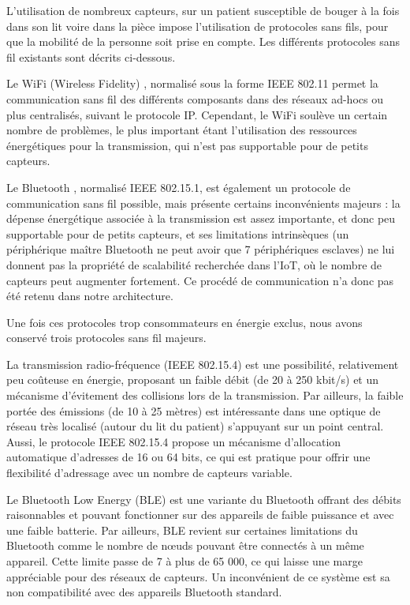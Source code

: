 \documentclass{article}
\begin{document}
L’utilisation de nombreux capteurs, sur un patient susceptible de bouger à la fois dans son lit voire dans la pièce impose l’utilisation de protocoles sans fils, pour que la mobilité de la personne soit prise en compte. Les différents protocoles sans fil existants sont décrits ci-dessous.

Le WiFi (Wireless Fidelity) \cite{Wifi}, normalisé sous la forme IEEE 802.11 permet la communication sans fil des différents composants dans des réseaux ad-hocs ou plus centralisés, suivant le protocole IP. Cependant, le WiFi soulève un certain nombre de problèmes, le plus important étant l'utilisation des ressources énergétiques pour la transmission, qui n’est pas supportable pour de petits capteurs.

Le Bluetooth \cite{Bluetooth}, normalisé IEEE 802.15.1, est également un protocole de communication sans fil possible, mais présente certains inconvénients majeurs : la dépense énergétique associée à la transmission est assez importante, et donc peu supportable pour de petits capteurs, et ses limitations intrinsèques (un périphérique maître Bluetooth ne peut avoir que 7 périphériques esclaves) ne lui donnent pas la propriété de scalabilité recherchée dans l'IoT, où le nombre de capteurs peut augmenter fortement. Ce procédé de communication n'a donc pas été retenu dans notre architecture.

Une fois ces protocoles trop consommateurs en énergie exclus, nous avons conservé trois protocoles sans fil majeurs.

La transmission radio-fréquence (IEEE 802.15.4) \cite{1IEEE802.15.4} \cite{2IEEE802.15.4} est une possibilité, relativement peu coûteuse en énergie, proposant un faible débit (de 20 à 250 kbit/s) et un mécanisme d’évitement des collisions lors de la transmission. Par ailleurs, la faible portée des émissions (de 10 à 25 mètres) est intéressante dans une optique de réseau très localisé (autour du lit du patient) s’appuyant sur un point central. Aussi, le protocole IEEE 802.15.4 propose un mécanisme d’allocation automatique d’adresses de 16 ou 64 bits, ce qui est pratique pour offrir une flexibilité d’adressage avec un nombre de capteurs variable.

Le Bluetooth Low Energy (BLE) \cite{BLE} est une variante du Bluetooth offrant des débits raisonnables et pouvant fonctionner sur des appareils de faible puissance et avec une faible batterie. Par ailleurs, BLE revient sur certaines limitations du Bluetooth comme le nombre de nœuds pouvant être connectés à un même appareil. Cette limite passe de 7 à plus de 65 000, ce qui laisse une marge appréciable pour des réseaux de capteurs. Un inconvénient de ce système est sa non compatibilité avec des appareils Bluetooth standard.
\end{document}

